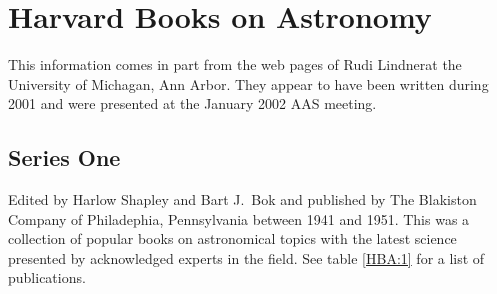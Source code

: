 
\section{Harvard Books on Astronomy}

This information comes in part from the web pages of Rudi
Lindner\footnotemark at the University of Michagan, Ann Arbor. They
appear to have been written during 2001 and were presented at the
January 2002 AAS meeting.


\subsection{Series One}

Edited by Harlow Shapley and Bart J.\ Bok and published by The
Blakiston Company of Philadephia, Pennsylvania between 1941 and 1951.
This was a collection of popular books on astronomical topics with the
latest science presented by acknowledged experts in the field. See
table \ref{HBA:1} for a list of publications.

